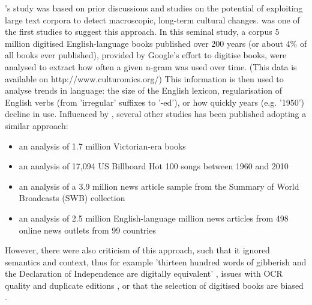 \documentclass{report}
\begin{document}
\cite{lansdall2017content}'s study was based on prior discussions and studies on the potential of exploiting large text corpora to detect macroscopic, long-term cultural changes. 
\cite{michel2011quantitative} was one of the first studies to suggest this approach.
In this seminal study, a corpus 5 million digitised English-language books published over 200 years (or about 4\% of all books ever published), provided by Google's effort to digitise books, were analysed to extract how often a given n-gram was used over time. (This data is available on http://www.culturomics.org/)
This information is then used to analyse trends in language: the size of the English lexicon, regularisation of English verbs (from 'irregular' suffixes to '-ed'), or how quickly years (e.g. '1950') decline in use.
Influenced by \cite{michel2011quantitative}, several other studies has been published adopting a similar approach: 
\begin{itemize}
	\item an analysis of 1.7 million Victorian-era books \cite{gibbs2011conversation}
	\item an analysis of 17,094 US Billboard Hot 100 songs between 1960 and 2010 \cite{mauch2015evolution}
	\item an analysis of a 3.9 million news article sample from the Summary of World Broadcasts (SWB) collection \cite{leetaru2011culturomics}
	\item an analysis of 2.5 million English-language million news articles from 498 online news outlets from 99 countries \cite{flaounas2013research}
\end{itemize}
However, there were also criticism of this approach, such that it ignored semantics and context, thus for example 'thirteen hundred words of gibberish and the Declaration of Independence are digitally equivalent' \cite{gooding2013mass}, issues with OCR quality and duplicate editions \cite{gooding2013mass}, or that the selection of digitised books are biased \cite{schwartz2011culturomics}.
\end{document}
